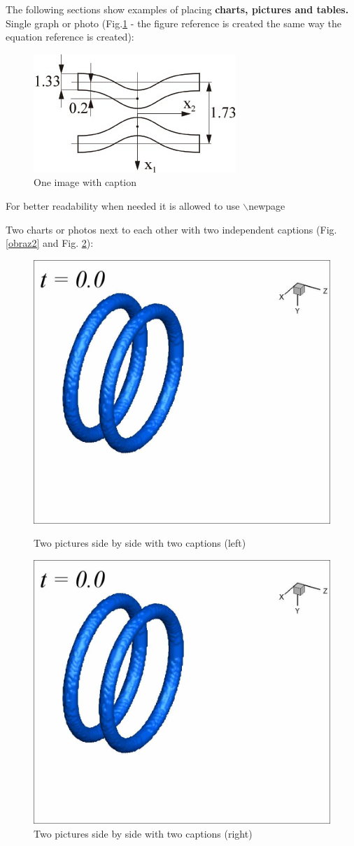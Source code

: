 \documentclass[english, a4paper]{article}
\begin{document}
The following sections show examples of placing \textbf{charts, pictures and tables.}
Single graph or photo  (Fig.\ref{obraz1} - the figure reference is created the same way the equation reference is created):
\begin{figure}[h!]
\centering
\includegraphics[width=0.35\linewidth]{figure1.jpg}
\caption{One image with caption}\label{obraz1}
\end{figure}

For better readability when needed it is allowed to use $\backslash$newpage
\newpage

Two charts or photos next to each other with two independent captions (Fig. \ref{obraz2} and Fig. \ref{obraz3}):

\begin{figure}[htb]
\centering
\begin{minipage}[t]{0.42\linewidth}
\centering
\includegraphics[width=0.65\linewidth]{figure1a.jpg}
\caption{Two pictures side by side with two captions (left)}\label{obraz2}
\end{minipage}
\quad
\begin{minipage}[t]{0.42\linewidth}
\centering
\includegraphics[width=0.65\linewidth]{figure1a.jpg}
\caption{Two pictures side by side with two captions (right)}\label{obraz3}
\end{minipage}
\end{figure}
\end{document}

